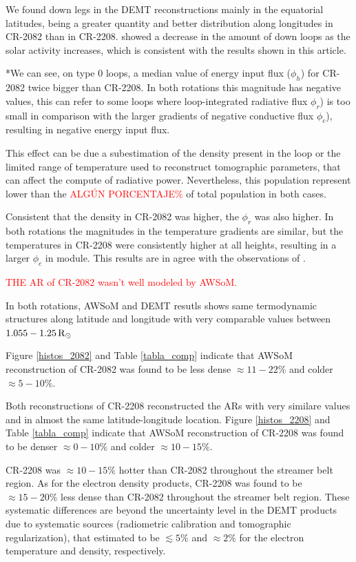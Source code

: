 \documentclass[namedreferences]{solarphysics}
\newcommand{\mrsun}{{\rm R_\odot}}
\def\diego#1{\textcolor{red}{#1}}
\begin{document}
\begin{article}
We found down legs in the DEMT reconstructions mainly in the equatorial latitudes, being a greater quantity and better distribution along longitudes in CR-2082 than in CR-2208. \citet{nuevo_2013} showed a decrease in the amount of down loops as the solar activity increases, which is consistent with the results shown in this article.


*We can see, on type 0 loops, a median value of energy input flux ($\phi_h$) for CR-2082 twice bigger than CR-2208. In both rotations this magnitude has negative values, this can refer to some loops where loop-integrated radiative flux $\phi_r$) is too small in comparison with the larger gradients of negative conductive flux $\phi_c$), resulting in negative energy input flux. 

This effect can be due a subestimation of the density present in the loop or the limited range of temperature used to reconstruct tomographic parameters, that can affect the compute of radiative power. Nevertheless, this population represent lower than the \diego{ALGÚN PORCENTAJE$\%$} of total population in both cases.

Consistent that the density in CR-2082 was higher, the $\phi_r$ was also higher. In both rotations the magnitudes in the temperature gradients are similar, but the temperatures in CR-2208 were consistently higher at all heights, resulting in a larger $\phi_c$ in module. This results are in agree with the observations of \citet{maccormack_2017}.

\diego{THE AR of CR-2082 wasn't well modeled by AWSoM.}

In both rotations, AWSoM and DEMT resutls shows same termodynamic structures along latitude and longitude with very comparable values between $1.055 - 1.25\,\mrsun$

Figure \ref{histos_2082} and Table \ref{tabla_comp} indicate that AWSoM reconstruction of CR-2082 was found to be less dense $\approx 11-22\%$ and colder $\approx 5-10\%$.

Both reconstructions of CR-2208 reconstructed the ARs with very similare values and in almost the same latitude-longitude location. Figure \ref{histos_2208} and Table \ref{tabla_comp} indicate that AWSoM reconstruction of CR-2208 was found to be denser $\approx 0-10\%$ and colder $\approx 10-15\%$.

CR-2208 was $\approx 10-15\%$ hotter than CR-2082 throughout the streamer belt region. As for the electron density products, CR-2208 was found to be $\approx 15-20\%$ less dense than CR-2082 throughout the streamer belt region. These systematic differences are beyond the uncertainty level in the DEMT products due to systematic sources (radiometric calibration and tomographic regularization), that \citet{lloveras_2017} estimated to be $\lesssim 5\%$ and $\approx 2\%$ for the electron temperature and density, respectively.


\end{article}
\end{document}
